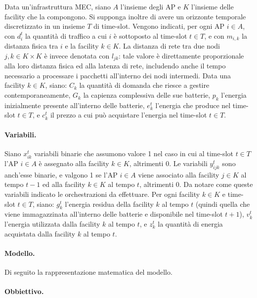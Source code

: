 Data un'infrastruttura MEC, siano $A$ l'insieme degli AP e $K$ l'insieme delle facility che la compongono. Si supponga inoltre di avere un orizzonte temporale discretizzato in un insieme $T$ di time-slot. Vengono indicati, per ogni AP $i \in A$, con $d^t_i$ la quantità di traffico a cui $i$ è sottoposto al time-slot $t \in T$, e con $m_{i,k}$ la distanza fisica tra $i$ e la facility $k \in K$. La distanza di rete tra due nodi $j, k \in K \times K$ è invece denotata con $l_{jk}$: tale valore è direttamente proporzionale alla loro distanza fisica ed alla latenza di rete, includendo anche il tempo necessario a processare i pacchetti all'interno dei nodi intermedi. Data una facility $k \in K$, siano: $C_k$ la quantità di domanda che riesce a gestire contemporaneamente, $G_k$ la capienza complessiva delle sue batterie, $p_k$ l'energia inizialmente presente all'interno delle batterie, $e^t_k$ l'energia che produce nel time-slot $t \in T$, e $c^t_k$ il prezzo a cui può acquistare l'energia nel time-slot $t \in T$.

\paragraph*{Variabili.}

Siano $x^t_{ik}$ variabili binarie che assumono valore 1 nel caso in cui al time-slot $t \in T$ l'AP $i \in A$ è assegnato alla facility $k \in K$, altrimenti 0. Le variabili $y^t_{ijk}$ sono anch'esse binarie, e valgono 1 se l'AP $i \in A$ viene associato alla facility $j \in K$ al tempo $t - 1$ ed alla facility $k \in K$ al tempo $t$, altrimenti 0. Da notare come queste variabili indicato le orchestrazioni da effettuare. Per ogni facility $k \in K$ e time-slot $t \in T$, siano: $g^t_k$ l'energia residua della facility $k$ al tempo $t$ (quindi quella che viene immagazzinata all'interno delle batterie e disponibile nel time-slot $t+1$), $v^t_k$ l'energia utilizzata dalla facility $k$ al tempo $t$, e $z^t_k$ la quantità di energia acquistata dalla facility $k$ al tempo $t$.

\paragraph*{Modello.}

Di seguito la rappresentazione matematica del modello.



\paragraph*{Obbiettivo.}

